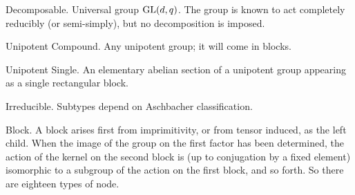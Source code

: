 Decomposable.  Universal group ${\rm GL}(d,q)$.  The group is known to act completely reducibly
(or semi-simply), but no decomposition is imposed.

Unipotent Compound.  Any unipotent group; it will come in blocks.

Unipotent Single.  An elementary abelian section of a unipotent group appearing as a single
rectangular block.

Irreducible.  Subtypes depend on Aschbacher classification.

Block.  A block arises first from imprimitivity, or from tensor induced, as the left child.  
When the image of the group on the first factor has been determined, the action of the kernel 
on the second block is
(up to conjugation by a fixed element) isomorphic to a subgroup of the action on the first block,
and so forth.  So there are eighteen types of node.
\bye


